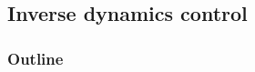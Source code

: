 \documentclass[10pt, aspectratio=169]{beamer}
\theoremstyle{remark}
\theoremstyle{definition}
\begin{document}
\subsection{Inverse dynamics control}


\begin{frame}
	\frametitle{Outline} %
\end{frame}
\end{document}
